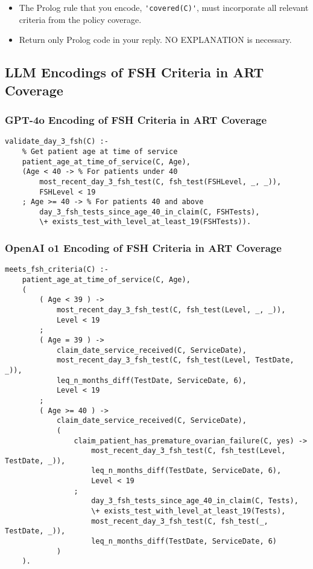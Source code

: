 \begin{itemize}
  \item The Prolog rule that you encode, \verb|'covered(C)'|, must incorporate 
        all relevant criteria from the policy coverage.

  \item Return only Prolog code in your reply. 
        NO EXPLANATION is necessary.

\end{itemize}

\subsection{LLM Encodings of FSH Criteria in ART Coverage}
\subsubsection{GPT-4o Encoding of FSH Criteria in ART Coverage}
\begin{verbatim}
validate_day_3_fsh(C) :-
    % Get patient age at time of service
    patient_age_at_time_of_service(C, Age),
    (Age < 40 -> % For patients under 40
        most_recent_day_3_fsh_test(C, fsh_test(FSHLevel, _, _)),
        FSHLevel < 19
    ; Age >= 40 -> % For patients 40 and above
        day_3_fsh_tests_since_age_40_in_claim(C, FSHTests),
        \+ exists_test_with_level_at_least_19(FSHTests)).
\end{verbatim}
\label{app:4o-fsh}

\subsubsection{OpenAI o1 Encoding of FSH Criteria in ART Coverage}
\begin{verbatim}
meets_fsh_criteria(C) :-
    patient_age_at_time_of_service(C, Age),
    (
        ( Age < 39 ) ->
            most_recent_day_3_fsh_test(C, fsh_test(Level, _, _)),
            Level < 19
        ;
        ( Age = 39 ) ->
            claim_date_service_received(C, ServiceDate),
            most_recent_day_3_fsh_test(C, fsh_test(Level, TestDate, _)),
            leq_n_months_diff(TestDate, ServiceDate, 6),
            Level < 19
        ;
        ( Age >= 40 ) ->
            claim_date_service_received(C, ServiceDate),
            (
                claim_patient_has_premature_ovarian_failure(C, yes) ->
                    most_recent_day_3_fsh_test(C, fsh_test(Level, TestDate, _)),
                    leq_n_months_diff(TestDate, ServiceDate, 6),
                    Level < 19
                ;
                    day_3_fsh_tests_since_age_40_in_claim(C, Tests),
                    \+ exists_test_with_level_at_least_19(Tests),
                    most_recent_day_3_fsh_test(C, fsh_test(_, TestDate, _)),
                    leq_n_months_diff(TestDate, ServiceDate, 6)
            )
    ).
\end{verbatim}
\label{app:o1-fsh}